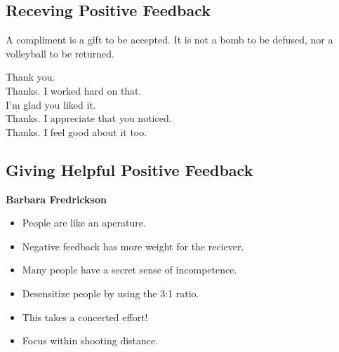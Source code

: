 \documentclass{article}
\begin{document}
\begin{tiny}

\begin{multicols}{3}

    \begin{tcolorbox}[breakable,colback=rainbow1]

	\section*{Receving Positive Feedback}

        A compliment is a gift to be accepted. It is not a bomb to be defused, nor a volleyball to be returned.

        \begin{description}
            \item[Thank you.]
            \item[Thanks. I worked hard on that.]
            \item[I'm glad you liked it.]
            \item[Thanks. I appreciate that you noticed.]
            \item[Thanks. I feel good about it too.]
        \end{description}

    \end{tcolorbox}

    \begin{tcolorbox}[breakable,colback=rainbow2]

	\section*{Giving Helpful Positive Feedback}

        \textbf{Barbara Fredrickson}
        \begin{itemize}
            \item People are like an aperature.
            \item Negative feedback has more weight for the reciever.
            \item Many people have a secret sense of incompetence.
            \item Desensitize people by using the 3:1 ratio.
            \item This takes a concerted effort!
            \item Focus within shooting distance.
        \end{itemize}


\end{tcolorbox}
\end{multicols}
\end{tiny}
\end{document}
